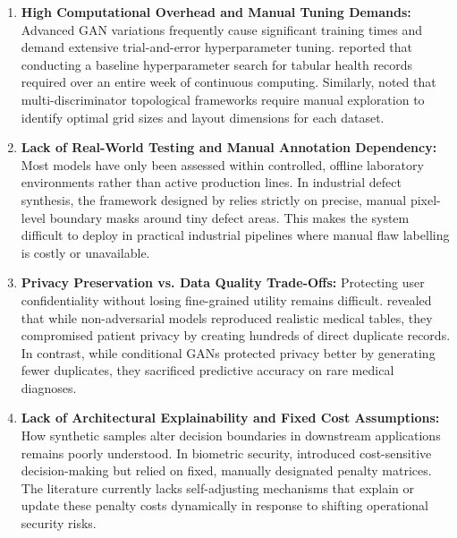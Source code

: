 \documentclass[12pt,a4paper]{article}
\begin{document}
\begin{enumerate}
    \item \textbf{High Computational Overhead and Manual Tuning Demands:}
    Advanced GAN variations frequently cause significant training times and demand extensive trial-and-error hyperparameter tuning. \textcite{bietsch2023electronic} reported that conducting a baseline hyperparameter search for tabular health records required over an entire week of continuous computing. Similarly, \textcite{li2024improving} noted that multi-discriminator topological frameworks require manual exploration to identify optimal grid sizes and layout dimensions for each dataset.

    \item \textbf{Lack of Real-World Testing and Manual Annotation Dependency:}
    Most models have only been assessed within controlled, offline laboratory environments rather than active production lines. In industrial defect synthesis, the framework designed by \textcite{li2023eid} relies strictly on precise, manual pixel-level boundary masks around tiny defect areas. This makes the system difficult to deploy in practical industrial pipelines where manual flaw labelling is costly or unavailable.

    \item \textbf{Privacy Preservation vs. Data Quality Trade-Offs:}
    Protecting user confidentiality without losing fine-grained utility remains difficult. \textcite{bietsch2023electronic} revealed that while non-adversarial models reproduced realistic medical tables, they compromised patient privacy by creating hundreds of direct duplicate records. In contrast, while conditional GANs protected privacy better by generating fewer duplicates, they sacrificed predictive accuracy on rare medical diagnoses.

    \item \textbf{Lack of Architectural Explainability and Fixed Cost Assumptions:}
    How synthetic samples alter decision boundaries in downstream applications remains poorly understood. In biometric security, \textcite{chen2020generative} introduced cost-sensitive decision-making but relied on fixed, manually designated penalty matrices. The literature currently lacks self-adjusting mechanisms that explain or update these penalty costs dynamically in response to shifting operational security risks.
\end{enumerate}

\end{document}

